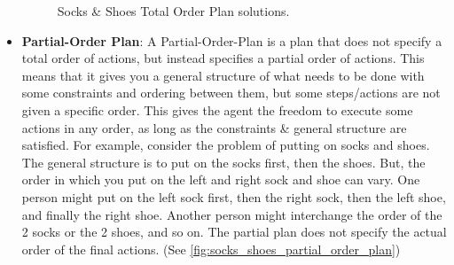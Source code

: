 \begin{itemize}
\begin{figure}[ht]
                  \caption{\centering Socks \& Shoes Total Order Plan solutions.}
                  \label{fig:socks_shoes_total_order_plan}
            \end{figure}

      \item \label{def:partial_order_plan}
            \textbf{Partial-Order Plan}: A Partial-Order-Plan is a plan that does not specify a total order of actions, but instead specifies a partial order of actions. This means that it gives you a general structure of what needs to be done with some constraints and ordering between them, but some steps/actions are not given a specific order. This gives the agent the freedom to execute some actions in any order, as long as the constraints \& general structure are satisfied. For example, consider the problem of putting on socks and shoes. The general structure is to put on the socks first, then the shoes. But, the order in which you put on the left and right sock and shoe can vary. One person might put on the left sock first, then the right sock, then the left shoe, and finally the right shoe. Another person might interchange the order of the 2 socks or the 2 shoes, and so on. The partial plan does not specify the actual order of the final actions. (See \autoref{fig:socks_shoes_partial_order_plan})

            \begin{figure}[ht]
                  \centering
\end{figure}
\end{itemize}
